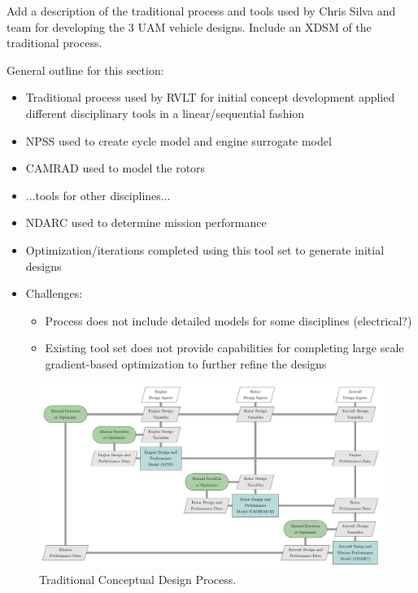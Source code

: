 
Add a description of the traditional process and tools used by Chris Silva and team for developing the 3 UAM vehicle designs.  Include an XDSM of the traditional process.  

General outline for this section:
\begin{itemize}
    \item Traditional process used by RVLT for initial concept development applied different disciplinary tools in a linear/sequential fashion
    \item NPSS used to create cycle model and engine surrogate model
    \item CAMRAD used to model the rotors
    \item ...tools for other disciplines...
    \item NDARC used to determine mission performance
    \item Optimization/iterations completed using this tool set to generate initial designs
    \item Challenges:
    \begin{itemize}
        \item Process does not include detailed models for some disciplines (electrical?)
        \item Existing tool set does not provide capabilities for completing large scale gradient-based optimization to further refine the designs
    \end{itemize}
\end{itemize}


\begin{figure}[htb]
\begin{center}
 \includegraphics[width=1.0\textwidth]{../Images/Traditional_XDSM.pdf}
 \caption{Traditional Conceptual Design Process.}
 \label{f:trad_XDSM}
\end{center}
\end{figure}

